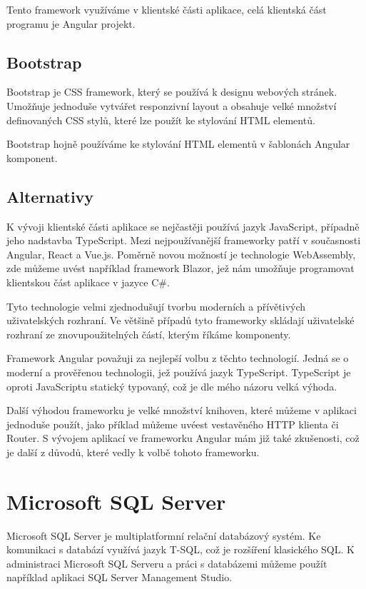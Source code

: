 Tento framework využíváme v klientské části aplikace, celá klientská část programu je Angular projekt.

\subsection{Bootstrap}
Bootstrap je CSS framework, který se používá k designu webových stránek.
Umožňuje jednoduše vytvářet responzivní layout a obsahuje velké množství definovaných CSS stylů, které lze použít ke stylování HTML elementů.
\cite{BootstrapDocs}

Bootstrap hojně používáme ke stylování HTML elementů v šablonách Angular komponent.

\subsection{Alternativy}
K vývoji klientské části aplikace se nejčastěji používá jazyk JavaScript, případně jeho nadstavba TypeScript. Mezi nejpoužívanější frameworky patří v současnosti Angular, React a Vue.js. 
Poměrně novou možností je technologie WebAssembly, zde můžeme uvést například framework Blazor, jež nám umožňuje programovat klientskou část aplikace v jazyce C\#.

Tyto technologie velmi zjednodušují tvorbu moderních a přívětivých uživatelských rozhraní. 
Ve většině případů tyto frameworky skládají uživatelské rozhraní ze znovupoužitelných částí, kterým říkáme komponenty.

Framework Angular považuji za nejlepší volbu z těchto technologií. Jedná se o moderní a prověřenou technologii, jež používá jazyk TypeScript. TypeScript je oproti JavaScriptu statický typovaný, což je dle mého názoru velká výhoda. 

Další výhodou frameworku je velké množství knihoven, které můžeme v aplikaci jednoduše použít, jako příklad můžeme uvéest vestavěného HTTP klienta či Router. 
S vývojem aplikací ve frameworku Angular mám již také zkušenosti, což je další z důvodů, které vedly k volbě tohoto frameworku.

\section{Microsoft SQL Server}
Microsoft SQL Server je multiplatformní relační databázový systém. Ke komunikaci s databází využívá jazyk T-SQL, což je rozšíření klasického SQL. K administraci Microsoft SQL Serveru a práci s databázemi můžeme použít například aplikaci SQL Server Management Studio.
\cite{SqlServerDocs}

